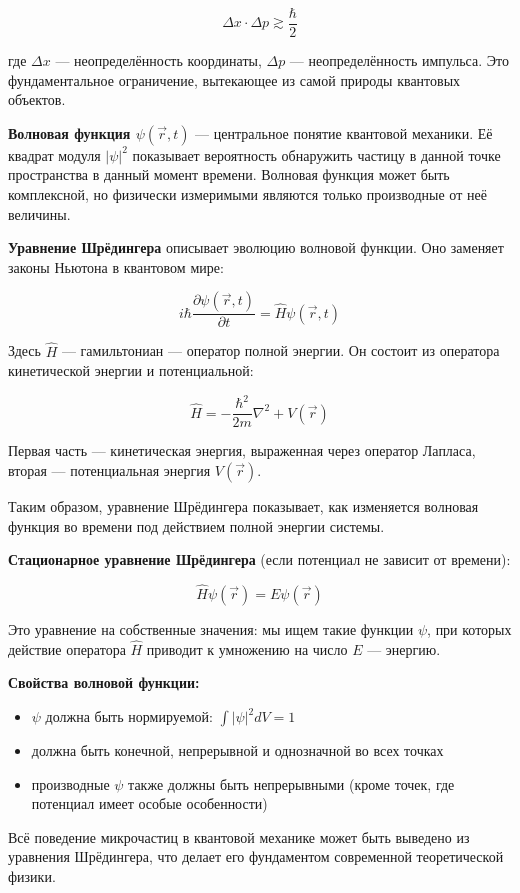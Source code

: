 \[
\Delta x \cdot \Delta p \gtrsim \frac{\hbar}{2}
\]

где $\Delta x$ — неопределённость координаты, $\Delta p$ — неопределённость импульса. Это фундаментальное ограничение, вытекающее из самой природы квантовых объектов.

\textbf{Волновая функция $\psi(\vec{r}, t)$} — центральное понятие квантовой механики. Её квадрат модуля $|\psi|^2$ показывает вероятность обнаружить частицу в данной точке пространства в данный момент времени. Волновая функция может быть комплексной, но физически измеримыми являются только производные от неё величины.

\textbf{Уравнение Шрёдингера} описывает эволюцию волновой функции. Оно заменяет законы Ньютона в квантовом мире:

\[
i\hbar \frac{\partial \psi(\vec{r}, t)}{\partial t} = \hat{H} \psi(\vec{r}, t)
\]

Здесь $\hat{H}$ — гамильтониан — оператор полной энергии. Он состоит из оператора кинетической энергии и потенциальной:

\[
\hat{H} = -\frac{\hbar^2}{2m} \nabla^2 + V(\vec{r})
\]

Первая часть — кинетическая энергия, выраженная через оператор Лапласа, вторая — потенциальная энергия $V(\vec{r})$.

Таким образом, уравнение Шрёдингера показывает, как изменяется волновая функция во времени под действием полной энергии системы.

\textbf{Стационарное уравнение Шрёдингера} (если потенциал не зависит от времени):

\[
\hat{H} \psi(\vec{r}) = E \psi(\vec{r})
\]

Это уравнение на собственные значения: мы ищем такие функции $\psi$, при которых действие оператора $\hat{H}$ приводит к умножению на число $E$ — энергию.

\textbf{Свойства волновой функции:}
\begin{itemize}
    \item $\psi$ должна быть нормируемой: $\int |\psi|^2 dV = 1$
    \item должна быть конечной, непрерывной и однозначной во всех точках
    \item производные $\psi$ также должны быть непрерывными (кроме точек, где потенциал имеет особые особенности)
\end{itemize}

Всё поведение микрочастиц в квантовой механике может быть выведено из уравнения Шрёдингера, что делает его фундаментом современной теоретической физики.

